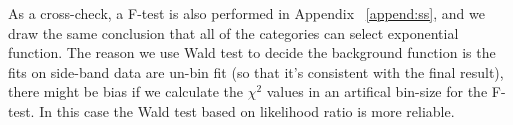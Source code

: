 As a cross-check, a F-test is also performed in Appendix ~\ref{append:ss}, and we draw the same conclusion that all of the categories can select exponential function.
The reason we use Wald test to decide the background function is the fits on side-band data are un-bin fit (so that it's consistent with the final result), 
    there might be bias if we calculate the $\chi^2$ values in an artifical bin-size for the F-test. In this case the Wald test based on likelihood ratio is more reliable.

\begin{figure}[htbp]
  \centering
   \\

\end{figure}
